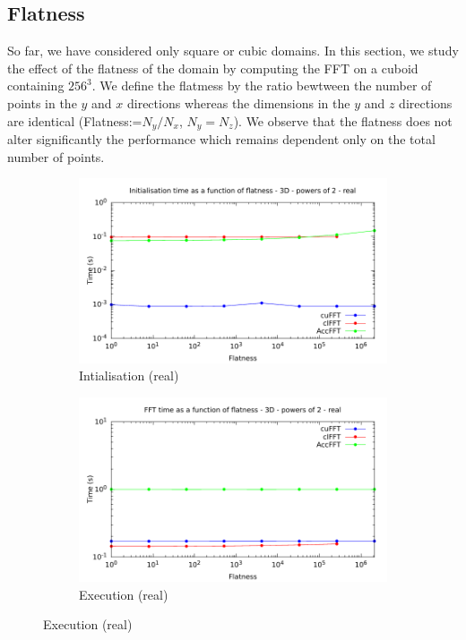 \documentclass[12pt, a4paper]{article}
\begin{document}
\subsection{Flatness}
So far, we have considered only square or cubic domains. In this section, we study the effect of the flatness of the domain by computing the FFT on a cuboid containing $256^3$. We define the flatmess by the ratio bewtween the number of points in the $y$ and $x$ directions whereas the dimensions in the $y$ and $z$ directions are identical (Flatness:=$N_y/N_x$, $N_y=N_z$). We observe that the flatness does not alter significantly the performance which remains dependent only on the total number of points.
\begin{figure}[H]
\captionsetup{width=0.8\linewidth}
\centering
\begin{subfigure}{.5\textwidth}
\centering
\includegraphics[width=.9\linewidth]{graphs/flatness-r-init.pdf}
\caption{Intialisation (real)}
\label{FFT1DRI}
\end{subfigure}%
\begin{subfigure}{.5\textwidth}
\centering
\includegraphics[width=.9\linewidth]{graphs/flatness-r-exec.pdf}
\caption{Execution (real)}

\end{subfigure}
\end{figure}
\end{document}
